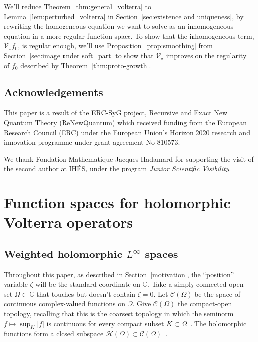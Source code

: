 \documentclass{article}
\theoremstyle{plain}
\newcommand{\C}{\mathbb{C}}
\newcommand{\cont}{\mathcal{C}}
\newcommand{\holo}{\mathcal{H}}
\newcommand{\softpart}{\mathcal{V}_\star}
\begin{document}
We'll reduce Theorem~\ref{thm:general_volterra} to Lemma~\ref{lem:perturbed_volterra} in Section~\ref{sec:existence and uniqueness}, by rewriting the homogeneous equation we want to solve as an inhomogeneous equation in a more regular function space. To show that the inhomogeneous term, $\softpart f_0$, is regular enough, we'll use Proposition~\ref{prop:smoothing} from Section~\ref{sec:image under soft_part} to show that $\softpart$ improves on the regularity of $f_0$ described by Theorem~\ref{thm:proto-growth}.


\subsection{Acknowledgements}

This paper is a result of the ERC-SyG project, Recursive and Exact New Quantum Theory (ReNewQuantum) which received funding from the European Research Council (ERC) under the European Union's Horizon 2020 research and innovation programme under grant agreement No 810573. 

We thank Fondation Mathematique Jacques Hadamard for supporting the visit of the second author at IH\'ES, under the program \textit{Junior Scientific Visibility}.  


\section{Function spaces for holomorphic Volterra operators}\label{fn-spaces}
\subsection{Weighted holomorphic $L^\infty$ spaces}\label{sec:fn-space-defs}
Throughout this paper, as described in Section~\ref{motivation}, the ``position'' variable $\zeta$ will be the standard coordinate on $\C$. Take a simply connected open set $\Omega \subset \C$ that touches but doesn't contain $\zeta = 0$. Let $\cont(\Omega)$ be the space of continuous complex-valued functions on $\Omega$. Give $\cont(\Omega)$ the compact-open topology, recalling that this is the coarsest topology in which the seminorm $f \mapsto \sup_K |f|$ is continuous for every compact subset $K \subset \Omega$~\cite[Example~2.6 and \S 4 notes]{fnl-cpx-anal}. The holomorphic functions form a closed subspace $\holo(\Omega) \subset \cont(\Omega)$~\cite[Proposition~3.14]{fnl-cpx-anal}.
\end{document}
